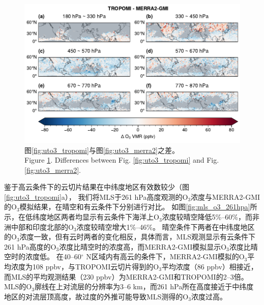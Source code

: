 \begin{figure}[!htbp]
    \centering
    \includegraphics[width=15cm]{./figures/uto3_delta.pdf}
    \caption{
    图\ref{fig:uto3_tropomi}与图\ref{fig:uto3_merra2}之差。 \\
    Figure \ref{fig:uto3_delta}. Differences between Fig. \ref{fig:uto3_tropomi} and Fig. \ref{fig:uto3_merra2}.
    }
    \label{fig:uto3_delta}
\end{figure}


鉴于高云条件下的云切片结果在中纬度地区有效数较少（图\ref{fig:uto3_tropomi}a），
我们将MLS于261 hPa高度观测的O$_3$浓度与MERRA2-GMI的O$_3$模拟结果，在晴空和有云条件下分别进行对比。
如图\ref{fig:mls_o3_261hpa}所示，在低纬度地区两者均显示有云条件下海洋上O$_3$浓度较晴空降低5\%--60\%，而非洲中部和印度北部的O$_3$浓度较晴空增大1\%--46\%。
晴空条件下两者在中纬度地区的O$_3$浓度一致，但有云时两者的变化相反，具体而言，MLS观测显示有云条件下261 hPa高度的O$_3$浓度比晴空时的浓度高，而MERRA2-GMI模拟显示O$_3$浓度比晴空时的浓度低。
在40--60$^{\circ}$ N区域内有高云的条件下，MERRA2-GMI模拟的O$_3$平均浓度为108 ppbv，与TROPOMI云切片得到的O$_3$平均浓度（86 ppbv）相接近，而MLS的平均观测结果（230 ppbv）为MERRA2-GMI和TROPOMI的2--3倍。
MLS的O$_3$廓线在上对流层的分辨率为3--6 km，而261 hPa所在高度接近于中纬度地区的对流层顶高度，故过度的外推可能导致MLS测得的O$_3$浓度过高\citep{Schoeberl.2007}。


